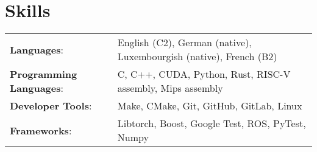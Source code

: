 \documentclass[a4paper,12pt]{article}
\begin{document}
\section{Skills}
\footnotesize{
\begin{tabularx}{\linewidth}{@{}l X@{}}
    \textbf{Languages}: & { English (C2), German (native), Luxembourgish (native), French (B2)} \\
    \textbf{Programming Languages}: & { C, C++, CUDA, Python, Rust, RISC-V assembly, Mips assembly} \\
    \textbf{Developer Tools}: & { Make, CMake, Git, GitHub, GitLab, Linux} \\
    \textbf{Frameworks}: & { Libtorch, Boost, Google Test, ROS, PyTest, Numpy} \\
\end{tabularx}
}
\end{document}
